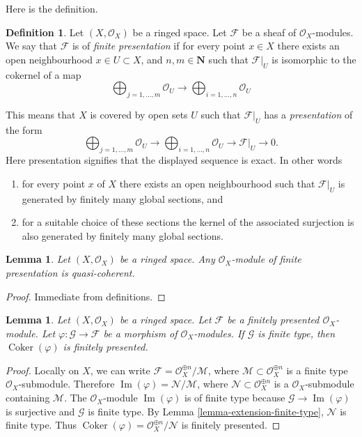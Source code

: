 \documentclass{stacks-project}
\theoremstyle{plain}
\newtheorem{lemma}[subsection]{Lemma}
\theoremstyle{definition}
\newtheorem{definition}[subsection]{Definition}
\theoremstyle{remark}
\numberwithin{equation}{subsection}
\def\Im{\mathop{\mathrm{Im}}}
\def\Coker{\mathop{\mathrm{Coker}}}
\begin{document}
\noindent
Here is the definition.

\begin{definition}
\label{definition-finite-presentation}
Let $(X, \mathcal{O}_X)$ be a ringed space.
Let $\mathcal{F}$ be a sheaf of $\mathcal{O}_X$-modules.
We say that $\mathcal{F}$ is of {\it finite presentation}
if for every point $x \in X$ there exists an open neighbourhood
$x\in U \subset X$, and  $n, m \in \mathbf{N}$ such that $\mathcal{F}|_U$
is isomorphic to the cokernel of a map
$$
\bigoplus\nolimits_{j = 1, \ldots, m}
\mathcal{O}_U
\longrightarrow
\bigoplus\nolimits_{i = 1, \ldots, n}
\mathcal{O}_U
$$
\end{definition}

\noindent
This means that $X$ is covered by open sets $U$
such that $\mathcal{F}|_U$ has a {\it presentation}
of the form
$$
\bigoplus\nolimits_{j = 1, \ldots, m}
\mathcal{O}_U
\longrightarrow
\bigoplus\nolimits_{i = 1, \ldots, n}
\mathcal{O}_U
\to
\mathcal{F}|_U
\to
0.
$$
Here presentation signifies that the displayed
sequence is exact. In other words
\begin{enumerate}
\item for every point $x$ of $X$ there exists
an open neighbourhood such that $\mathcal{F}|_U$
is generated by finitely many global sections, and
\item for a suitable choice of these sections
the kernel of the associated surjection is also
generated by finitely many global sections.
\end{enumerate}

\begin{lemma}
\label{lemma-finite-presentation-quasi-coherent}
Let $(X, \mathcal{O}_X)$ be a ringed space.
Any $\mathcal{O}_X$-module of finite presentation
is quasi-coherent.
\end{lemma}

\begin{proof}
Immediate from definitions.
\end{proof}

\begin{lemma}
\label{lemma-cokernel-finite-finite-presentation}
Let $(X,\mathcal{O}_X)$ be a ringed space. Let $\mathcal{F}$ be a
finitely presented $\mathcal{O}_X$-module. Let
$\varphi : \mathcal{G} \to \mathcal{F}$ be a morphism of
$\mathcal{O}_X$-modules. If $\mathcal{G}$ is finite type, then
$\Coker(\varphi)$ is finitely presented.
\end{lemma}

\begin{proof}
Locally on $X$, we can write
$\mathcal{F} = \mathcal{O}_X^{\oplus n} / \mathcal{M}$, where
$\mathcal{M} \subset \mathcal{O}_X^{\oplus n}$ is a finite type
$\mathcal{O}_X$-submodule. Therefore
$\Im(\varphi) = \mathcal{N} / \mathcal{M}$, where
$\mathcal{N} \subset \mathcal{O}_X^{\oplus n}$ is a
$\mathcal{O}_X$-submodule containing $\mathcal{M}$.
The $\mathcal{O}_X$-module $\Im(\varphi)$ is of finite type
because $\mathcal{G} \to \Im(\varphi)$ is surjective and
$\mathcal{G}$ is finite type. By Lemma \ref{lemma-extension-finite-type},
$\mathcal{N}$ is finite type. Thus
$\Coker(\varphi) = \mathcal{O}_X^{\oplus n} / \mathcal{N}$
is finitely presented.
\end{proof}
\end{document}
